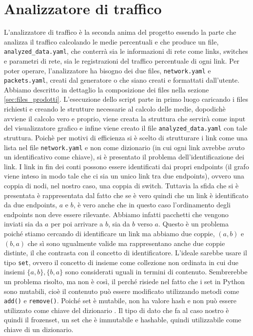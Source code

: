\documentclass[binding=0.6cm]{sapthesis}
\begin{document}
\chapter{Analizzatore di traffico}
L'analizzatore di traffico è la seconda anima del progetto essendo la parte che analizza il traffico calcolando le medie percentuali e che produce
un file, \texttt{analyzed\_data.yaml}, che conterrà sia le informazioni di rete come links, switches e parametri di rete, sia le registrazioni del traffico percentuale
di ogni link. Per poter operare, l'analizzatore ha bisogno dei due files, \texttt{network.yaml} e \texttt{packets.yaml}, creati dal generatore o che siano
creati e formattati dall'utente. Abbiamo descritto in dettaglio la composizione dei files nella sezione \ref{sec:files_prodotti}.
L'esecuzione dello script parte in primo luogo caricando i files richiesti e creando le strutture necessarie al calcolo delle medie, dopodichè
avviene il calcolo vero e proprio, viene creata la struttura che servirà come input del visualizzatore grafico e infine viene creato il file
\texttt{analyzed\_data.yaml} con tale struttura.
Poichè per motivi di efficienza si è scelto di strutturare i link come una lista nel file \texttt{network.yaml} e non come dizionario (in cui ogni link avrebbe avuto un identificativo come chiave), si è presentato il problema dell'identificazione dei link.
I link in fin dei conti possono essere identificati dai propri endpoints (il grafo viene inteso in modo tale che ci sia un unico link tra due endpoints), ovvero una coppia di nodi,
nel nostro caso, una coppia di switch. Tuttavia la sfida che si è presentata è rappresentata dal fatto che se è vero quindi che un link è identificato
da due endpoints, \(a\) e \(b\), è vero anche che in questo caso l'ordinamento degli endpoints non deve essere rilevante. Abbiamo infatti pacchetti
che vengono inviati sia da \(a\) per poi arrivare a \(b\), sia da \(b\) verso \(a\). Questo è un problema poiché stiamo cercando di identificare un link ma abbiamo
due coppie, \((a, b)\) e \((b, a)\) che sì sono ugualmente valide ma rappresentano anche due coppie distinte, il che contrasta con il concetto di identificatore. 
L'ideale sarebbe usare il tipo \texttt{set}, ovvero il concetto di insieme 
come collezione non ordinata in cui due insiemi \(\{a, b\}, \{b, a\}\) sono considerati uguali in termini di contenuto. Sembrerebbe un problema risolto, ma non è così, il perché risiede
nel fatto che i set in Python sono mutabili, cioè il contenuto può essere modificato utilizzando metodi come \texttt{add()} e \texttt{remove()}. 
Poiché set è mutabile, non ha valore hash \cite{pythonGlossaryHashable} e non può essere utilizzato come chiave del dizionario \cite{pythonStdTypesMapping}.
Il tipo di dato che fa al caso nostro è quindi il frozenset, un set che è immutabile e hashable, quindi utilizzabile come chiave di un dizionario.
\end{document}
